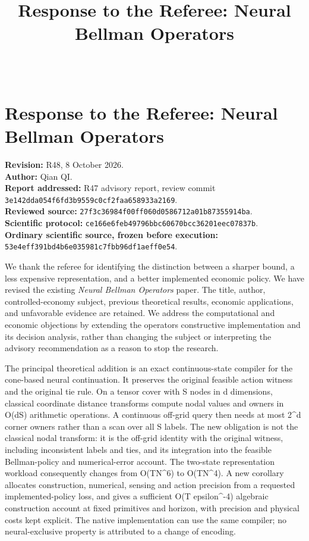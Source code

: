 \documentclass[ecta,nameyear,draft]{econsocart}
\begin{document}
\begin{frontmatter}
\title{Response to the Referee: Neural Bellman Operators}
\begin{aug}\author[id=au1,addressref={add1}]{~}\address[id=add1]{Peking University}\end{aug}
\end{frontmatter}
\hypertarget{response-to-the-referee-neural-bellman-operators}{%
\section{Response to the Referee: Neural Bellman
Operators}\label{response-to-the-referee-neural-bellman-operators}}

\textbf{Revision:} R48, 8 October 2026.\\
\textbf{Author:} Qian QI.\\
\textbf{Report addressed:} R47 advisory report, review commit
\nolinkurl{3e142dda054f6fd3b9559c0cf2faa658933a2169}.\\
\textbf{Reviewed source:}
\nolinkurl{27f3c36984f00ff060d0586712a01b87355914ba}.\\
\textbf{Scientific protocol:}
\nolinkurl{ce166e6feb49796bbc60670bcc36201eec07837b}.\\
\textbf{Ordinary scientific source, frozen before execution:}
\nolinkurl{53e4eff391bd4b6e035981c7fbb96df1aeff0e54}.

We thank the referee for identifying the distinction between a sharper
bound, a less expensive representation, and a better implemented
economic policy. We have revised the existing \emph{Neural Bellman
Operators} paper. The title, author, controlled-economy subject,
previous theoretical results, economic applications, and unfavorable
evidence are retained. We address the computational and economic
objections by extending the operator\textquotesingle s constructive
implementation and its decision analysis, rather than changing the
subject or interpreting the advisory recommendation as a reason to stop
the research.

The principal theoretical addition is an exact continuous-state compiler
for the cone-based neural continuation. It preserves the original
feasible action witness and the original tie rule. On a tensor cover
with S nodes in d dimensions, classical coordinate distance transforms
compute nodal values and owners in O(dS) arithmetic operations. A
continuous off-grid query then needs at most 2\^{}d corner owners rather
than a scan over all S labels. The new obligation is not the classical
nodal transform: it is the off-grid identity with the original witness,
including inconsistent labels and ties, and its integration into the
feasible Bellman-policy and numerical-error account. The two-state
representation workload consequently changes from O(TN\^{}6) to
O(TN\^{}4). A new corollary allocates construction, numerical, sensing
and action precision from a requested implemented-policy loss, and gives
a sufficient O(T epsilon\^{}-4) algebraic construction account at fixed
primitives and horizon, with precision and physical costs kept explicit.
The native implementation can use the same compiler; no neural-exclusive
property is attributed to a change of encoding.
\end{document}
